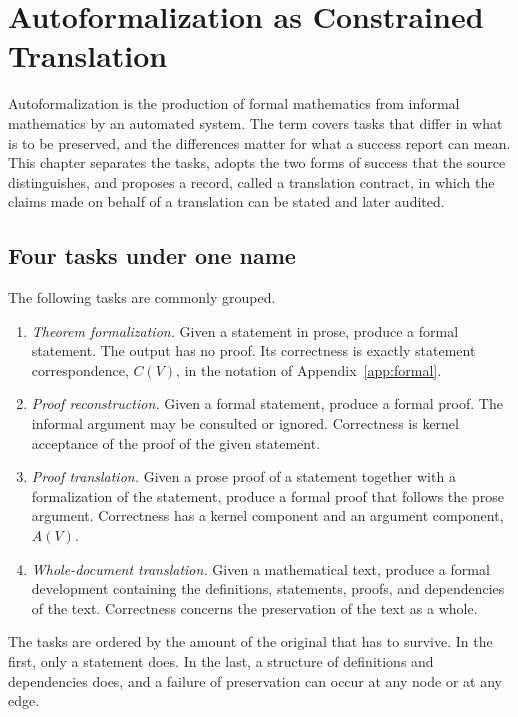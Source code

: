 \chapter{Autoformalization as Constrained Translation}
\label{ch:autoformal}

Autoformalization is the production of formal mathematics from informal mathematics by an automated system. The term covers tasks that differ in what is to be preserved, and the differences matter for what a success report can mean. This chapter separates the tasks, adopts the two forms of success that the source distinguishes, and proposes a record, called a translation contract, in which the claims made on behalf of a translation can be stated and later audited.

\section{Four tasks under one name}

The following tasks are commonly grouped.

\begin{enumerate}[label=(\roman*)]
\item \emph{Theorem formalization.} Given a statement in prose, produce a formal statement. The output has no proof. Its correctness is exactly statement correspondence, $C(V)$, in the notation of Appendix~\ref{app:formal}.
\item \emph{Proof reconstruction.} Given a formal statement, produce a formal proof. The informal argument may be consulted or ignored. Correctness is kernel acceptance of the proof of the given statement.
\item \emph{Proof translation.} Given a prose proof of a statement together with a formalization of the statement, produce a formal proof that follows the prose argument. Correctness has a kernel component and an argument component, $A(V)$.
\item \emph{Whole-document translation.} Given a mathematical text, produce a formal development containing the definitions, statements, proofs, and dependencies of the text. Correctness concerns the preservation of the text as a whole.
\end{enumerate}

The tasks are ordered by the amount of the original that has to survive. In the first, only a statement does. In the last, a structure of definitions and dependencies does, and a failure of preservation can occur at any node or at any edge.

